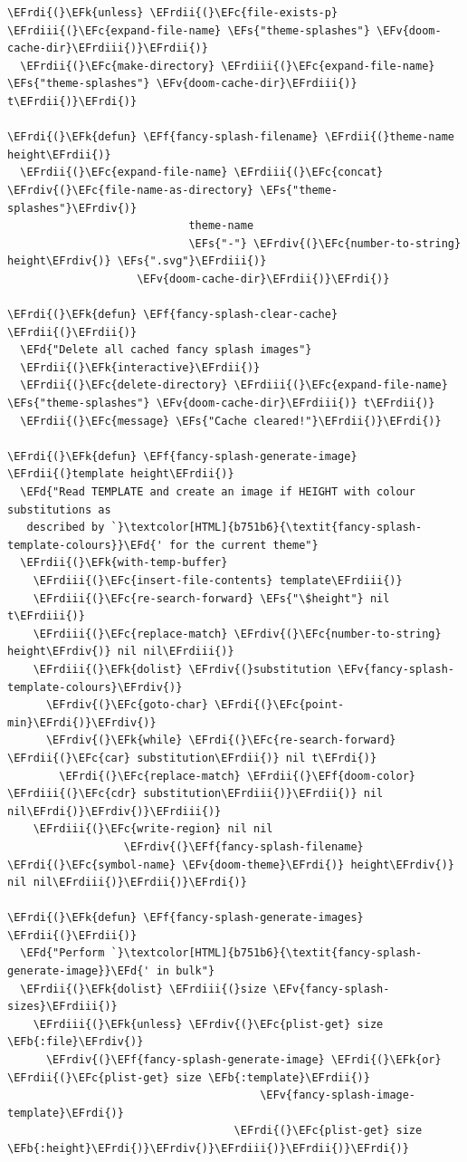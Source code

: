 \documentclass{scrartcl}
\newcommand{\EFk}[1]{\textcolor{EFk}{#1}} %
\newcommand{\EFd}[1]{\textcolor{EFd}{\textit{#1}}} %
\newcommand{\EFs}[1]{\textcolor{EFs}{#1}} %
\newcommand{\EFb}[1]{\textcolor{EFb}{#1}} %
\newcommand{\EFc}[1]{\textcolor{EFc}{#1}} %
\newcommand{\EFv}[1]{\textcolor{EFv}{#1}} %
\newcommand{\EFf}[1]{\textcolor{EFf}{#1}} %
\newcommand{\EFrdi}[1]{\textcolor{EFrdi}{#1}} %
\newcommand{\EFrdii}[1]{\textcolor{EFrdii}{#1}} %
\newcommand{\EFrdiii}[1]{\textcolor{EFrdiii}{#1}} %
\newcommand{\EFrdiv}[1]{\textcolor{EFrdiv}{#1}} %
\begin{document}
\begin{Code}
\begin{Verbatim}[]
\EFrdi{(}\EFk{unless} \EFrdii{(}\EFc{file-exists-p} \EFrdiii{(}\EFc{expand-file-name} \EFs{"theme-splashes"} \EFv{doom-cache-dir}\EFrdiii{)}\EFrdii{)}
  \EFrdii{(}\EFc{make-directory} \EFrdiii{(}\EFc{expand-file-name} \EFs{"theme-splashes"} \EFv{doom-cache-dir}\EFrdiii{)} t\EFrdii{)}\EFrdi{)}

\EFrdi{(}\EFk{defun} \EFf{fancy-splash-filename} \EFrdii{(}theme-name height\EFrdii{)}
  \EFrdii{(}\EFc{expand-file-name} \EFrdiii{(}\EFc{concat} \EFrdiv{(}\EFc{file-name-as-directory} \EFs{"theme-splashes"}\EFrdiv{)}
                            theme-name
                            \EFs{"-"} \EFrdiv{(}\EFc{number-to-string} height\EFrdiv{)} \EFs{".svg"}\EFrdiii{)}
                    \EFv{doom-cache-dir}\EFrdii{)}\EFrdi{)}

\EFrdi{(}\EFk{defun} \EFf{fancy-splash-clear-cache} \EFrdii{(}\EFrdii{)}
  \EFd{"Delete all cached fancy splash images"}
  \EFrdii{(}\EFk{interactive}\EFrdii{)}
  \EFrdii{(}\EFc{delete-directory} \EFrdiii{(}\EFc{expand-file-name} \EFs{"theme-splashes"} \EFv{doom-cache-dir}\EFrdiii{)} t\EFrdii{)}
  \EFrdii{(}\EFc{message} \EFs{"Cache cleared!"}\EFrdii{)}\EFrdi{)}

\EFrdi{(}\EFk{defun} \EFf{fancy-splash-generate-image} \EFrdii{(}template height\EFrdii{)}
  \EFd{"Read TEMPLATE and create an image if HEIGHT with colour substitutions as
   described by `}\textcolor[HTML]{b751b6}{\textit{fancy-splash-template-colours}}\EFd{' for the current theme"}
  \EFrdii{(}\EFk{with-temp-buffer}
    \EFrdiii{(}\EFc{insert-file-contents} template\EFrdiii{)}
    \EFrdiii{(}\EFc{re-search-forward} \EFs{"\$height"} nil t\EFrdiii{)}
    \EFrdiii{(}\EFc{replace-match} \EFrdiv{(}\EFc{number-to-string} height\EFrdiv{)} nil nil\EFrdiii{)}
    \EFrdiii{(}\EFk{dolist} \EFrdiv{(}substitution \EFv{fancy-splash-template-colours}\EFrdiv{)}
      \EFrdiv{(}\EFc{goto-char} \EFrdi{(}\EFc{point-min}\EFrdi{)}\EFrdiv{)}
      \EFrdiv{(}\EFk{while} \EFrdi{(}\EFc{re-search-forward} \EFrdii{(}\EFc{car} substitution\EFrdii{)} nil t\EFrdi{)}
        \EFrdi{(}\EFc{replace-match} \EFrdii{(}\EFf{doom-color} \EFrdiii{(}\EFc{cdr} substitution\EFrdiii{)}\EFrdii{)} nil nil\EFrdi{)}\EFrdiv{)}\EFrdiii{)}
    \EFrdiii{(}\EFc{write-region} nil nil
                  \EFrdiv{(}\EFf{fancy-splash-filename} \EFrdi{(}\EFc{symbol-name} \EFv{doom-theme}\EFrdi{)} height\EFrdiv{)} nil nil\EFrdiii{)}\EFrdii{)}\EFrdi{)}

\EFrdi{(}\EFk{defun} \EFf{fancy-splash-generate-images} \EFrdii{(}\EFrdii{)}
  \EFd{"Perform `}\textcolor[HTML]{b751b6}{\textit{fancy-splash-generate-image}}\EFd{' in bulk"}
  \EFrdii{(}\EFk{dolist} \EFrdiii{(}size \EFv{fancy-splash-sizes}\EFrdiii{)}
    \EFrdiii{(}\EFk{unless} \EFrdiv{(}\EFc{plist-get} size \EFb{:file}\EFrdiv{)}
      \EFrdiv{(}\EFf{fancy-splash-generate-image} \EFrdi{(}\EFk{or} \EFrdii{(}\EFc{plist-get} size \EFb{:template}\EFrdii{)}
                                       \EFv{fancy-splash-image-template}\EFrdi{)}
                                   \EFrdi{(}\EFc{plist-get} size \EFb{:height}\EFrdi{)}\EFrdiv{)}\EFrdiii{)}\EFrdii{)}\EFrdi{)}


\end{Verbatim}
\end{Code}
\end{document}
